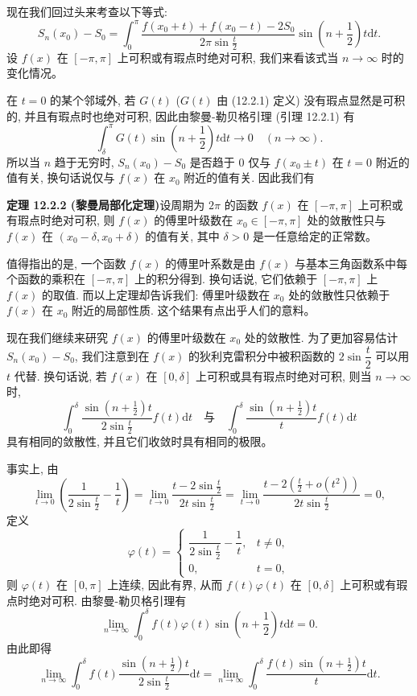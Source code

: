 \documentclass[UTF8,12pt,a4paper,fontset=fandol]{ctexart}
\begin{document}
现在我们回过头来考查以下等式:
\[
  S_n(x_0)-S_0
  =\int_0^\pi\frac{f(x_0+t)+f(x_0-t)-2S_0}{2\pi\sin\frac t2}
    \sin\left(n+\frac12\right)t\mathrm dt.
\]
设 $f(x)$ 在 $[-\pi,\pi]$ 上可积或有瑕点时绝对可积, 我们来看该式当 $n\to\infty$ 时的变化情况。

在 $t=0$ 的某个邻域外, 若 $G(t)$ ($G(t)$ 由 (12.2.1) 定义) 没有瑕点显然是可积的, 并且有瑕点时也绝对可积, 因此由黎曼-勒贝格引理 (引理 12.2.1) 有
\[
  \int_\delta^\pi G(t)\sin\left(n+\frac12\right)t\mathrm dt\to0
  \quad (n\to\infty).
\]
所以当 $n$ 趋于无穷时, $S_n(x_0)-S_0$ 是否趋于 $0$ 仅与 $f(x_0\pm t)$ 在 $t=0$ 附近的值有关, 换句话说仅与 $f(x)$ 在 $x_0$ 附近的值有关. 因此我们有

\noindent\textbf{定理 12.2.2 (黎曼局部化定理)}\quad 设周期为 $2\pi$ 的函数 $f(x)$ 在 $[-\pi,\pi]$ 上可积或有瑕点时绝对可积, 则 $f(x)$ 的傅里叶级数在 $x_0\in[-\pi,\pi]$ 处的敛散性只与 $f(x)$ 在 $(x_0-\delta,x_0+\delta)$ 的值有关, 其中 $\delta>0$ 是一任意给定的正常数。

值得指出的是, 一个函数 $f(x)$ 的傅里叶系数是由 $f(x)$ 与基本三角函数系中每个函数的乘积在 $[-\pi,\pi]$ 上的积分得到. 换句话说, 它们依赖于 $[-\pi,\pi]$ 上 $f(x)$ 的取值. 而以上定理却告诉我们: 傅里叶级数在 $x_0$ 处的敛散性只依赖于 $f(x)$ 在 $x_0$ 附近的局部性质. 这个结果有点出乎人们的意料。

现在我们继续来研究 $f(x)$ 的傅里叶级数在 $x_0$ 处的敛散性. 为了更加容易估计 $S_n(x_0)-S_0$, 我们注意到在 $f(x)$ 的狄利克雷积分中被积函数的 $2\sin\dfrac t2$ 可以用 $t$ 代替. 换句话说, 若 $f(x)$ 在 $[0,\delta]$ 上可积或具有瑕点时绝对可积, 则当 $n\to\infty$ 时,
\[
  \int_0^\delta\frac{\sin\left(n+\frac12\right)t}{2\sin\frac t2}f(t)\mathrm dt
  \quad\text{与}\quad
  \int_0^\delta\frac{\sin\left(n+\frac12\right)t}{t}f(t)\mathrm dt
\]
具有相同的敛散性, 并且它们收敛时具有相同的极限。

事实上, 由
\[
  \lim_{t\to0}\left(\frac1{2\sin\frac t2}-\frac1t\right)
  =\lim_{t\to0}\frac{t-2\sin\frac t2}{2t\sin\frac t2}
  =\lim_{t\to0}\frac{t-2\left(\frac t2+o(t^2)\right)}{2t\sin\frac t2}=0,
\]
定义
\[
  \varphi(t)=
  \begin{cases}
    \dfrac1{2\sin\frac t2}-\dfrac1t, & t\ne0,\\
    0, & t=0,
  \end{cases}
\]
则 $\varphi(t)$ 在 $[0,\pi]$ 上连续, 因此有界, 从而 $f(t)\varphi(t)$ 在 $[0,\delta]$ 上可积或有瑕点时绝对可积. 由黎曼-勒贝格引理有
\[
  \lim_{n\to\infty}\int_0^\delta f(t)\varphi(t)\sin\left(n+\frac12\right)t\mathrm dt=0.
\]
由此即得
\[
  \lim_{n\to\infty}\int_0^\delta f(t)\frac{\sin\left(n+\frac12\right)t}{2\sin\frac t2}\mathrm dt
  =
  \lim_{n\to\infty}\int_0^\delta\frac{f(t)\sin\left(n+\frac12\right)t}{t}\mathrm dt.
\]
\end{document}
